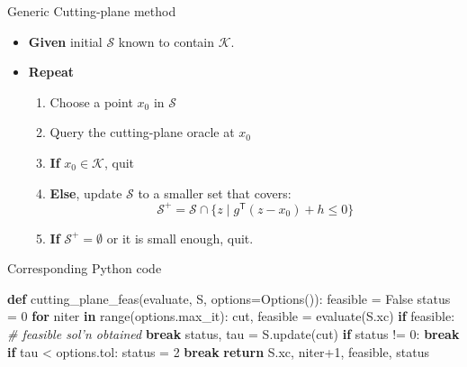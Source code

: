 \documentclass[10pt,ignorenonframetext,serif,onlymath]{beamer}
\newenvironment{Shaded}{}{}
\newcommand{\BuiltInTok}[1]{#1}
\newcommand{\CommentTok}[1]{\textcolor[rgb]{0.38,0.63,0.69}{\textit{#1}}}
\newcommand{\ControlFlowTok}[1]{\textcolor[rgb]{0.00,0.44,0.13}{\textbf{#1}}}
\newcommand{\DecValTok}[1]{\textcolor[rgb]{0.25,0.63,0.44}{#1}}
\newcommand{\KeywordTok}[1]{\textcolor[rgb]{0.00,0.44,0.13}{\textbf{#1}}}
\newcommand{\NormalTok}[1]{#1}
\newcommand{\OperatorTok}[1]{\textcolor[rgb]{0.40,0.40,0.40}{#1}}
\newcommand{\VariableTok}[1]{\textcolor[rgb]{0.10,0.09,0.49}{#1}}
\providecommand{\tightlist}{%
  \setlength{\itemsep}{0pt}\setlength{\parskip}{0pt}}
\begin{document}
\begin{frame}{Generic Cutting-plane method}
\protect\hypertarget{generic-cutting-plane-method}{}

\begin{itemize}
\tightlist
\item
  \textbf{Given} initial \(\mathcal{S}\) known to contain
  \(\mathcal{K}\).
\item
  \textbf{Repeat}

  \begin{enumerate}
  [1.]
  \tightlist
  \item
    Choose a point \(x_0\) in \(\mathcal{S}\)
  \item
    Query the cutting-plane oracle at \(x_0\)
  \item
    \textbf{If} \(x_0 \in \mathcal{K}\), quit
  \item
    \textbf{Else}, update \(\mathcal{S}\) to a smaller set that covers:
    \[\mathcal{S}^+ = \mathcal{S} \cap \{z \mid g^\mathsf{T} (z - x_0) + h \leq 0\}\]
  \item
    \textbf{If} \(\mathcal{S}^+ = \emptyset\) or it is small enough,
    quit.
  \end{enumerate}
\end{itemize}

\end{frame}

\begin{frame}[fragile]{Corresponding Python code}
\protect\hypertarget{corresponding-python-code}{}

\begin{Shaded}
\begin{Highlighting}[]
\KeywordTok{def}\NormalTok{ cutting_plane_feas(evaluate, S, options}\OperatorTok{=}\NormalTok{Options()):}
\NormalTok{    feasible }\OperatorTok{=} \VariableTok{False}
\NormalTok{    status }\OperatorTok{=} \DecValTok{0}
    \ControlFlowTok{for}\NormalTok{ niter }\KeywordTok{in} \BuiltInTok{range}\NormalTok{(options.max_it):}
\NormalTok{        cut, feasible }\OperatorTok{=}\NormalTok{ evaluate(S.xc)}
        \ControlFlowTok{if}\NormalTok{ feasible:  }\CommentTok{# feasible sol'n obtained}
            \ControlFlowTok{break}
\NormalTok{        status, tau }\OperatorTok{=}\NormalTok{ S.update(cut)}
        \ControlFlowTok{if}\NormalTok{ status }\OperatorTok{!=} \DecValTok{0}\NormalTok{:}
            \ControlFlowTok{break}
        \ControlFlowTok{if}\NormalTok{ tau }\OperatorTok{<}\NormalTok{ options.tol:}
\NormalTok{            status }\OperatorTok{=} \DecValTok{2}
            \ControlFlowTok{break}
    \ControlFlowTok{return}\NormalTok{ S.xc, niter}\OperatorTok{+}\DecValTok{1}\NormalTok{, feasible, status}
\end{Highlighting}
\end{Shaded}

\end{frame}
\end{document}
